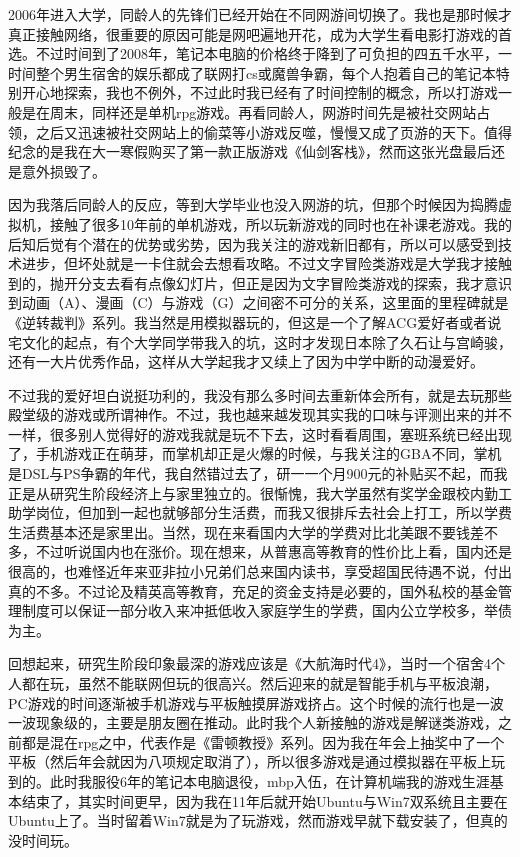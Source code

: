 \documentclass[
  letterpaper,
  DIV=11,
  numbers=noendperiod]{scrreprt}
\begin{document}
2006年进入大学，同龄人的先锋们已经开始在不同网游间切换了。我也是那时候才真正接触网络，很重要的原因可能是网吧遍地开花，成为大学生看电影打游戏的首选。不过时间到了2008年，笔记本电脑的价格终于降到了可负担的四五千水平，一时间整个男生宿舍的娱乐都成了联网打cs或魔兽争霸，每个人抱着自己的笔记本特别开心地探索，我也不例外，不过此时我已经有了时间控制的概念，所以打游戏一般是在周末，同样还是单机rpg游戏。再看同龄人，网游时间先是被社交网站占领，之后又迅速被社交网站上的偷菜等小游戏反噬，慢慢又成了页游的天下。值得纪念的是我在大一寒假购买了第一款正版游戏《仙剑客栈》，然而这张光盘最后还是意外损毁了。

因为我落后同龄人的反应，等到大学毕业也没入网游的坑，但那个时候因为捣腾虚拟机，接触了很多10年前的单机游戏，所以玩新游戏的同时也在补课老游戏。我的后知后觉有个潜在的优势或劣势，因为我关注的游戏新旧都有，所以可以感受到技术进步，但坏处就是一卡住就会去想看攻略。不过文字冒险类游戏是大学我才接触到的，抛开分支去看有点像幻灯片，但正是因为文字冒险类游戏的探索，我才意识到动画（A）、漫画（C）与游戏（G）之间密不可分的关系，这里面的里程碑就是《逆转裁判》系列。我当然是用模拟器玩的，但这是一个了解ACG爱好者或者说宅文化的起点，有个大学同学带我入的坑，这时才发现日本除了久石让与宫崎骏，还有一大片优秀作品，这样从大学起我才又续上了因为中学中断的动漫爱好。

不过我的爱好坦白说挺功利的，我没有那么多时间去重新体会所有，就是去玩那些殿堂级的游戏或所谓神作。不过，我也越来越发现其实我的口味与评测出来的并不一样，很多别人觉得好的游戏我就是玩不下去，这时看看周围，塞班系统已经出现了，手机游戏正在萌芽，而掌机却正是火爆的时候，与我关注的GBA不同，掌机是DSL与PS争霸的年代，我自然错过去了，研一一个月900元的补贴买不起，而我正是从研究生阶段经济上与家里独立的。很惭愧，我大学虽然有奖学金跟校内勤工助学岗位，但加到一起也就够部分生活费，而我又很排斥去社会上打工，所以学费生活费基本还是家里出。当然，现在来看国内大学的学费对比北美跟不要钱差不多，不过听说国内也在涨价。现在想来，从普惠高等教育的性价比上看，国内还是很高的，也难怪近年来亚非拉小兄弟们总来国内读书，享受超国民待遇不说，付出真的不多。不过论及精英高等教育，充足的资金支持是必要的，国外私校的基金管理制度可以保证一部分收入来冲抵低收入家庭学生的学费，国内公立学校多，举债为主。

回想起来，研究生阶段印象最深的游戏应该是《大航海时代4》，当时一个宿舍4个人都在玩，虽然不能联网但玩的很高兴。然后迎来的就是智能手机与平板浪潮，PC游戏的时间逐渐被手机游戏与平板触摸屏游戏挤占。这个时候的流行也是一波一波现象级的，主要是朋友圈在推动。此时我个人新接触的游戏是解谜类游戏，之前都是混在rpg之中，代表作是《雷顿教授》系列。因为我在年会上抽奖中了一个平板（然后年会就因为八项规定取消了），所以很多游戏是通过模拟器在平板上玩到的。此时我服役6年的笔记本电脑退役，mbp入伍，在计算机端我的游戏生涯基本结束了，其实时间更早，因为我在11年后就开始Ubuntu与Win7双系统且主要在Ubuntu上了。当时留着Win7就是为了玩游戏，然而游戏早就下载安装了，但真的没时间玩。
\end{document}
